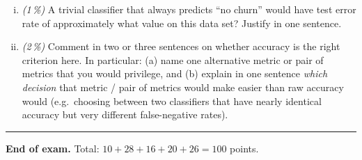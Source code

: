 \documentclass[11pt,a4paper]{article}
\newcommand{\subpoints}[1]{\textit{(#1\,\%)}}
\begin{document}
\begin{enumerate}[(i)]
  \item \subpoints{1} A trivial classifier that always predicts ``no churn'' would have test error rate of approximately what value on this data set? Justify in one sentence.

  \item \subpoints{2} Comment in two or three sentences on whether accuracy is the right criterion here. In particular: (a) name one alternative metric or pair of metrics that you would privilege, and (b) explain in one sentence \emph{which decision} that metric / pair of metrics would make easier than raw accuracy would (e.g.\ choosing between two classifiers that have nearly identical accuracy but very different false-negative rates).
\end{enumerate}

\vspace{1em}
\hrule
\vspace{0.5em}

\noindent\textbf{End of exam.} \quad Total: $10 + 28 + 16 + 20 + 26 = 100$ points.
\end{document}
